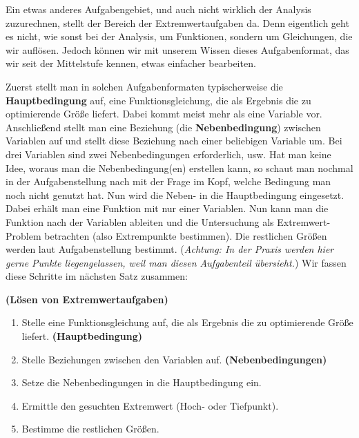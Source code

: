 \documentclass[ngerman, 12pt]{nssheetxea}
\begin{document}
Ein etwas anderes Aufgabengebiet, und auch nicht wirklich der Analysis zuzurechnen, stellt der Bereich der Extremwertaufgaben da. Denn eigentlich geht es nicht, wie sonst bei der Analysis, um Funktionen, sondern um Gleichungen, die wir auflösen. Jedoch können wir mit unserem Wissen dieses Aufgabenformat, das wir seit der Mittelstufe kennen, etwas einfacher bearbeiten. \par
Zuerst stellt man in solchen Aufgabenformaten typischerweise die \textbf{Hauptbedingung} auf, eine Funktionsgleichung, die als Ergebnis die zu optimierende Größe liefert. Dabei kommt meist mehr als eine Variable vor. Anschließend stellt man eine Beziehung (die \textbf{Nebenbedingung}) zwischen Variablen auf und stellt diese Beziehung nach einer beliebigen Variable um. Bei drei Variablen sind zwei Nebenbedingungen erforderlich, usw. Hat man keine Idee, woraus man die Nebenbedingung(en) erstellen kann, so schaut man nochmal in der Aufgabenstellung nach mit der Frage im Kopf, welche Bedingung man noch nicht genutzt hat. Nun wird die Neben- in die Hauptbedingung eingesetzt. Dabei erhält man eine Funktion mit nur einer Variablen. Nun kann man die Funktion nach der Variablen ableiten und die Untersuchung als Extremwert-Problem betrachten (also Extrempunkte bestimmen). Die restlichen Größen werden laut Aufgabenstellung bestimmt. (\textit{Achtung: In der Praxis werden hier gerne Punkte liegengelassen, weil man diesen Aufgabenteil übersieht.}) Wir fassen diese Schritte im nächsten Satz zusammen:
\begin{theorem}\textbf{(Lösen von Extremwertaufgaben)}
\begin{enumerate}
\item Stelle eine Funktionsgleichung auf, die als Ergebnis die zu optimierende Größe liefert. \textbf{(Hauptbedingung)}
\item Stelle Beziehungen zwischen den Variablen auf. \textbf{(Nebenbedingungen)}
\item Setze die Nebenbedingungen in die Hauptbedingung ein.
\item Ermittle den gesuchten Extremwert (Hoch- oder Tiefpunkt).
\item Bestimme die restlichen Größen.
\end{enumerate}
\label{Satz:Extremwertaufgaben}
\end{theorem}
\end{document}
